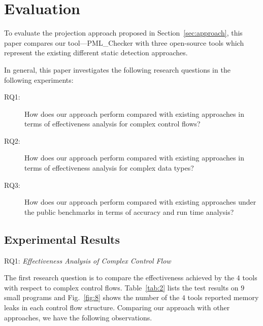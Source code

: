 \section{Evaluation}\label{sec:evaluation}

To evaluate the projection approach proposed in Section~\ref{sec:approach}, 
this paper compares our tool---PML\_Checker with three open-source tools which represent the existing different static detection approaches. 

In general, this paper investigates the following research questions in the following experiments:
\begin{description}
\item[RQ1:] How does our approach perform compared with existing approaches in terms of effectiveness analysis for complex control flows? 
\item[RQ2:] How does our approach perform compared with existing approaches in terms of effectiveness analysis for complex data types? 
\item[RQ3:] How does our approach perform compared with existing approaches under the public benchmarks in terms of accuracy and run time analysis? 
\end{description}

\subsection{Experimental Results}

\noindent RQ1: \textit{Effectiveness Analysis of Complex Control Flow}

The first research question is to compare the effectiveness achieved by the $4$ tools with respect to complex control flows. Table~\ref{tab:2} lists the test results on $9$ small programs and Fig.~\ref{fig:8} shows the number of the $4$ tools reported memory leaks in each control flow structure. Comparing our approach with other approaches, we have the following observations.

